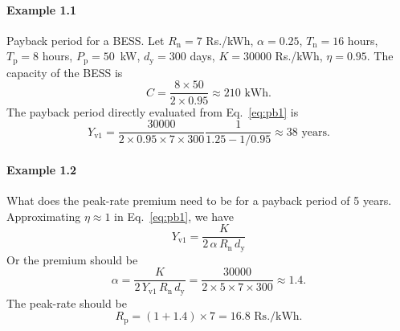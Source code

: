 \documentclass[a4paper]{article}
\begin{document}
\paragraph{Example 1.1} Payback period for a BESS.
Let $R_{\text{n}} = 7$ Rs./kWh, $\alpha = 0.25$,
$T_{\text{n}} = 16$ hours, $T_{\text{p}} = 8$ hours, $P_{\text{p}} = 50$~kW,
$d_\text{y} = 300$ days, $K = 30000$ Rs./kWh, $\eta = 0.95$. The capacity of the BESS is 
\begin{equation}
    C = \frac{8 \times 50}{2 \times 0.95} \approx 210 \text{ kWh}.
\end{equation}
The payback period directly evaluated from Eq.~\eqref{eq:pb1} is
\begin{equation}
    Y_\text{v1} = \frac{30000}{2 \times 0.95 \times 7 \times 300} 
    \frac{1}{1.25 - 1/0.95} \approx 38 \text{ years}.
\end{equation}

\paragraph{Example 1.2} What does the peak-rate premium need to be for a payback period of 5 years. 
Approximating $\eta \approx 1$ in Eq.~\eqref{eq:pb1}, we have
\begin{equation}
    Y_\text{v1} = \frac{K}{2 \, \alpha \, R_\text{n} \, d_\text{y}} 
\end{equation}
Or the premium should be
\begin{equation}
    \alpha = \frac{K}{2 \, Y_\text{v1} \, R_\text{n} \, d_\text{y}} = \frac{30000}{2 \times 5 \times 7 \times 300}  \approx 1.4.
\end{equation}
The peak-rate should be 
\begin{equation}
    R_{\text{p}} = (1+1.4) \times 7 = 16.8 \text{ Rs./kWh}.
\end{equation}
\end{document}
